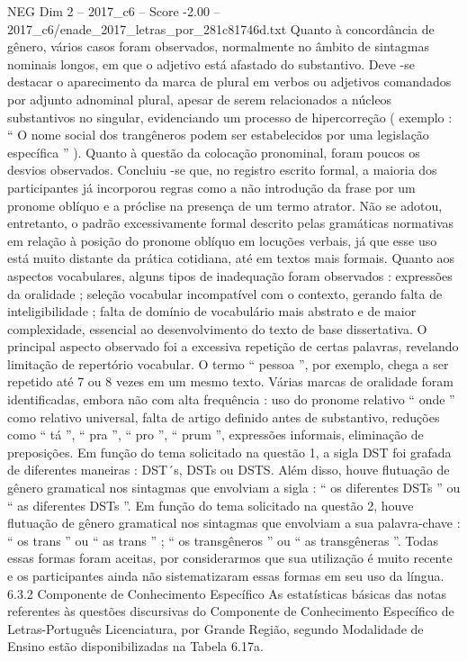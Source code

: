 \begin{textsample}{NEG Dim 2 – 2017\_c6 – Score -2.00 – 2017\_c6/enade\_2017\_letras\_por\_281c81746d.txt}
Quanto à concordância de gênero, vários casos foram observados, normalmente no âmbito de sintagmas nominais longos, em que o adjetivo está afastado do substantivo.
Deve -se destacar o aparecimento da marca de plural em verbos ou adjetivos comandados por adjunto adnominal plural, apesar de serem relacionados a núcleos substantivos no singular, evidenciando um processo de hipercorreção ( exemplo : “ O nome social dos trangêneros podem ser estabelecidos por uma legislação específica ” ).
Quanto à questão da colocação pronominal, foram poucos os desvios observados.
Concluiu -se que, no registro escrito formal, a maioria dos participantes já incorporou regras como a não introdução da frase por um pronome oblíquo e a próclise na presença de um termo atrator.
Não se adotou, entretanto, o padrão excessivamente formal descrito pelas gramáticas normativas em relação à posição do pronome oblíquo em locuções verbais, já que esse uso está muito distante da prática cotidiana, até em textos mais formais.
Quanto aos aspectos vocabulares, alguns tipos de inadequação foram observados : expressões da oralidade ; seleção vocabular incompatível com o contexto, gerando falta de inteligibilidade ; falta de domínio de vocabulário mais abstrato e de maior complexidade, essencial ao desenvolvimento do texto de base dissertativa.
O principal aspecto observado foi a excessiva repetição de certas palavras, revelando limitação de repertório vocabular.
O termo “ pessoa ”, por exemplo, chega a ser repetido até 7 ou 8 vezes em um mesmo texto.
Várias marcas de oralidade foram identificadas, embora não com alta frequência : uso do pronome relativo “ onde ” como relativo universal, falta de artigo definido antes de substantivo, reduções como “ tá ”, “ pra ”, “ pro ”, “ prum ”, expressões informais, eliminação de preposições.
Em função do tema solicitado na questão 1, a sigla DST foi grafada de diferentes maneiras : DST´s, DSTs ou DSTS.
Além disso, houve flutuação de gênero gramatical nos sintagmas que envolviam a sigla : “ os diferentes DSTs ” ou “ as diferentes DSTs ”.
Em função do tema solicitado na questão 2, houve flutuação de gênero gramatical nos sintagmas que envolviam a sua palavra-chave : “ os trans ” ou “ as trans ” ; “ os transgêneros ” ou “ as transgêneras ”.
Todas essas formas foram aceitas, por considerarmos que sua utilização é muito recente e os participantes ainda não sistematizaram essas formas em seu uso da língua. 6.3.2 Componente de Conhecimento Específico As estatísticas básicas das notas referentes às questões discursivas do Componente de Conhecimento Específico de Letras-Português Licenciatura, por Grande Região, segundo Modalidade de Ensino estão disponibilizadas na Tabela 6.17a.

\end{textsample}
